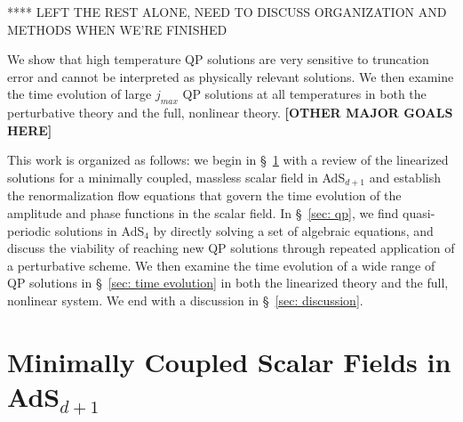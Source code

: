 \documentclass[../PhD.tex]{subfiles}
\begin{document}
****
LEFT THE REST ALONE, NEED TO DISCUSS ORGANIZATION AND METHODS WHEN WE'RE FINISHED

We show that high temperature QP solutions are very sensitive to truncation error and cannot be interpreted as physically relevant solutions. We then examine the time evolution of large $j_{max}$ QP solutions at all temperatures in both the perturbative theory and the full, nonlinear theory. {\bf [OTHER MAJOR GOALS HERE]}

This work is organized as follows: we begin in \S~\!\ref{sec: scalar in AdS} with a review of the linearized solutions for a minimally coupled, massless scalar field in AdS$_{d+1}$ and establish the renormalization flow equations that govern the time evolution of the amplitude and phase functions in the scalar field. In \S~\!\ref{sec: qp}, we find quasi-periodic solutions in AdS$_4$ by directly solving a set of algebraic equations, and discuss the viability of reaching new QP solutions through repeated application of a perturbative scheme. We then examine the time evolution of a wide range of QP solutions in \S\!~\ref{sec: time evolution} in both the linearized theory and the full, nonlinear system. We end with a discussion in \S~\!\ref{sec: discussion}. 


\section{Minimally Coupled Scalar Fields in AdS$_{d+1}$}
\label{sec: scalar in AdS}
\end{document}
